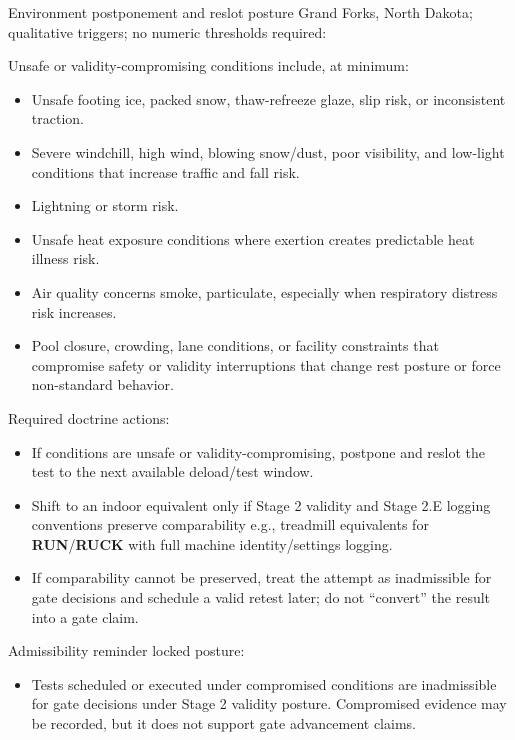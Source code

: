 \documentclass[10pt]{article}
\begin{document}
Environment postponement and reslot posture Grand Forks, North Dakota; qualitative triggers; no numeric thresholds required:

Unsafe or validity-compromising conditions include, at minimum:

\begin{itemize}
\item Unsafe footing ice, packed snow, thaw-refreeze glaze, slip risk, or inconsistent traction.
\item Severe windchill, high wind, blowing snow/dust, poor visibility, and low-light conditions that increase traffic and fall risk.
\item Lightning or storm risk.
\item Unsafe heat exposure conditions where exertion creates predictable heat illness risk.
\item Air quality concerns smoke, particulate, especially when respiratory distress risk increases.
\item Pool closure, crowding, lane conditions, or facility constraints that compromise safety or validity interruptions that change rest posture or force non-standard behavior.
\end{itemize}

Required doctrine actions:

\begin{itemize}
\item If conditions are unsafe or validity-compromising, postpone and reslot the test to the next available deload/test window.
\item Shift to an indoor equivalent only if Stage 2 validity and Stage 2.E logging conventions preserve comparability e.g., treadmill equivalents for \textbf{RUN}/\textbf{RUCK} with full machine identity/settings logging.
\item If comparability cannot be preserved, treat the attempt as inadmissible for gate decisions and schedule a valid retest later; do not “convert” the result into a gate claim.
\end{itemize}

Admissibility reminder locked posture:

\begin{itemize}
\item Tests scheduled or executed under compromised conditions are inadmissible for gate decisions under Stage 2 validity posture. Compromised evidence may be recorded, but it does not support gate advancement claims.
\end{itemize}
\end{document}
